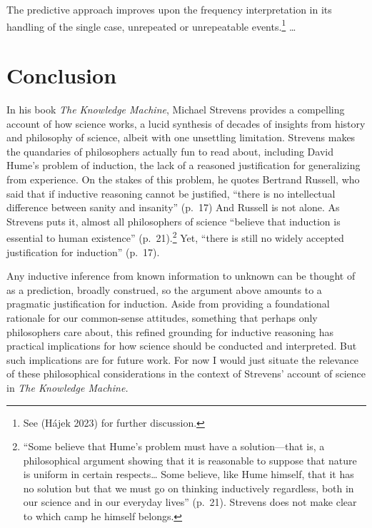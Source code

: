 \documentclass[
  letterpaper,
  DIV=11,
  numbers=noendperiod]{scrartcl}
\theoremstyle{definition}
\theoremstyle{remark}
\begin{document}
The predictive approach improves upon the frequency interpretation in
its handling of the single case, unrepeated or unrepeatable
events.\footnote{See (Hájek 2023) for further discussion.} \ldots{}

\section{Conclusion}\label{sec-conclude}

In his book \emph{The Knowledge Machine}, Michael Strevens provides a
compelling account of how science works, a lucid synthesis of decades of
insights from history and philosophy of science, albeit with one
unsettling limitation. Strevens makes the quandaries of philosophers
actually fun to read about, including David Hume's problem of induction,
the lack of a reasoned justification for generalizing from experience.
On the stakes of this problem, he quotes Bertrand Russell, who said that
if inductive reasoning cannot be justified, ``there is no intellectual
difference between sanity and insanity'' (p.~17) And Russell is not
alone. As Strevens puts it, almost all philosophers of science ``believe
that induction is essential to human existence'' (p.~21).\footnote{``Some
  believe that Hume's problem must have a solution---that is, a
  philosophical argument showing that it is reasonable to suppose that
  nature is uniform in certain respects\ldots{} Some believe, like Hume
  himself, that it has no solution but that we must go on thinking
  inductively regardless, both in our science and in our everyday
  lives'' (p.~21). Strevens does not make clear to which camp he himself
  belongs.} Yet, ``there is still no widely accepted justification for
induction'' (p.~17).

Any inductive inference from known information to unknown can be thought
of as a prediction, broadly construed, so the argument above amounts to
a pragmatic justification for induction. Aside from providing a
foundational rationale for our common-sense attitudes, something that
perhaps only philosophers care about, this refined grounding for
inductive reasoning has practical implications for how science should be
conducted and interpreted. But such implications are for future work.
For now I would just situate the relevance of these philosophical
considerations in the context of Strevens' account of science in
\emph{The Knowledge Machine.}
\end{document}
